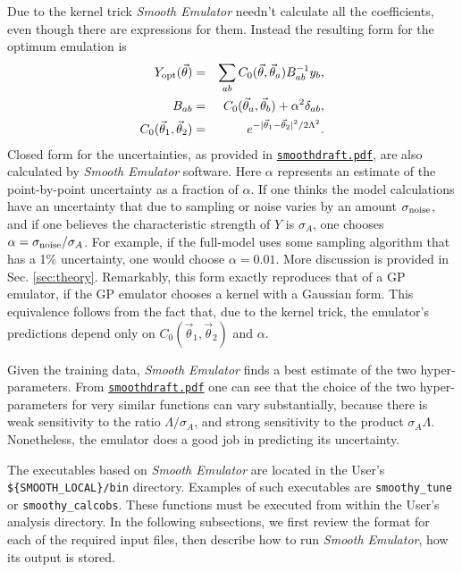 \documentclass[UserManual.tex]{subfiles}
\begin{document}
\begin{sloppypar}
Due to the kernel trick {\it Smooth Emulator} needn't calculate all the coefficients, even though there are expressions for them. Instead the resulting form for the optimum emulation is
\begin{eqnarray}
Y_{\rm opt}(\vec{\theta})&=&\sum_{ab}C_0(\vec{\theta},\vec{\theta}_a)B^{-1}_{ab}y_b,\\
\nonumber
B_{ab}&=&C_0(\vec{\theta}_a,\vec{\theta}_b)+\alpha^2\delta_{ab},\\
\nonumber
C_0(\vec{\theta}_1,\vec{\theta}_2)&=&e^{-|\vec{\theta}_1-\vec{\theta}_2|^2/2\Lambda^2}.
\end{eqnarray}
Closed form for the uncertainties, as provided in \href{./smoothdraft.pdf}{{\tt smoothdraft.pdf}}, are also calculated by {\it Smooth Emulator} software. Here $\alpha$ represents an estimate of the point-by-point uncertainty as a fraction of $\alpha$. If one thinks the model calculations have an uncertainty that due to sampling or noise varies by an amount $\sigma_{\rm noise}$, and if one believes the characteristic strength of $Y$ is $\sigma_A$, one chooses $\alpha=\sigma_{\rm noise}/\sigma_A$. For example, if the full-model uses some sampling algorithm that has a 1\% uncertainty, one would choose $\alpha=0.01$. More discussion is provided in Sec. \ref{sec:theory}. Remarkably, this form exactly reproduces that of a GP emulator, if the GP emulator chooses a kernel with a Gaussian form. This equivalence follows from the fact that, due to the kernel trick, the emulator's predictions depend only on $C_0(\vec{\theta}_1,\vec{\theta}_2)$ and $\alpha$.

Given the training data, {\it Smooth Emulator} finds a best estimate of the two hyper-parameters. From \href{./smoothdraft.pdf}{{\tt smoothdraft.pdf}} one can see that the choice of the two hyper-parameters for very similar functions can vary substantially, because there is weak sensitivity to the ratio $\Lambda/\sigma_A$, and strong sensitivity to the product $\sigma_A\Lambda$. Nonetheless, the emulator does a good job in predicting its uncertainty.

The executables based on {\it Smooth Emulator} are located in the User's {\tt \$\{SMOOTH\_LOCAL\}/bin} directory. Examples of such executables are {\tt smoothy\_tune} or {\tt smoothy\_calcobs}. These functions must be executed from within the User's analysis directory. In the following subsections, we first review the format for each of the required input files, then describe how to run {\it Smooth Emulator}, how its output is stored.



\end{sloppypar}
\end{document}
